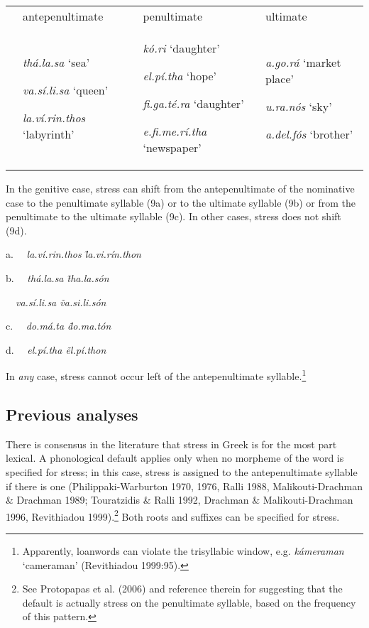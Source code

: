 \documentclass[a4paper]{article}
\begin{document}
\ea \begin{flushleft}
\tablehead{}
\begin{supertabular}{m{0.7045598in}m{1.6150599in}|m{1.7268599in}|m{1.5545598in}}


 &
 antepenultimate &
 penultimate &
 ultimate\\\hhline{~---}
 &
{ \textit{thá.la.sa} ‘sea’}

{ \textit{va.sí.li.sa} ‘queen’}

 \textit{la.ví.rin.thos} ‘labyrinth’ &
{ \textit{kó.ri} ‘daughter’}

{ \textit{el.pí.tha} ‘hope’}

{ \textit{fi.ga.té.ra} ‘daughter’}

 \textit{e.fi.me.rí.tha} ‘newspaper’ &
{ \textit{a.go.rá} ‘market place’}

{ \textit{u.ra.nós} ‘sky’}

 \textit{a.del.fós} ‘brother’\\
\end{supertabular}
\end{flushleft}
\z
{
In the genitive case, stress can shift from the antepenultimate of the nominative case to the penultimate syllable (9a) or to the ultimate syllable (9b) or from the penultimate to the ultimate syllable (9c). In other cases, stress does not shift (9d).}


\ea a. \ \ \textit{la.ví.rin.thos \~ la.vi.rín.thon}

{
b. \ \ \textit{thá.la.sa \~ tha.la.són}}

{
\ \ \textit{va.sí.li.sa \~ va.si.li.són}}

{
c. \ \ \textit{do.má.ta \~ do.ma.tón}}

{
d. \ \ \textit{el.pí.tha \~ el.pí.thon}}

\z

In \textit{any} case, stress cannot occur left of the antepenultimate syllable.\footnote{ Apparently, loanwords can violate the trisyllabic window, e.g. \textit{kámeraman} ‘cameraman’ (Revithiadou 1999:95).}



\subsection{
Previous analyses}


There is consensus in the literature that stress in Greek is for the most part lexical. A phonological default applies only when no morpheme of the word is specified for stress; in this case, stress is assigned to the antepenultimate syllable if there is one (Philippaki-Warburton 1970, 1976, Ralli 1988, Malikouti-Drachman \& Drachman 1989; Touratzidis \& Ralli 1992, Drachman \& Malikouti-Drachman 1996, Revithiadou 1999).\footnote{ See Protopapas et al. (2006) and reference therein for suggesting that the default is actually stress on the penultimate syllable, based on the frequency of this pattern.} Both roots and suffixes can be specified for stress.
\end{document}
